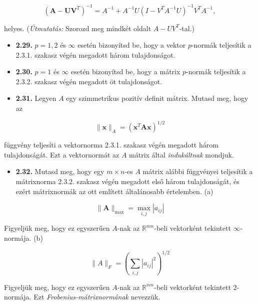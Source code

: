 \documentclass[
  magyar,
  11pt]{article}
\providecommand{\tightlist}{%
  \setlength{\itemsep}{0pt}\setlength{\parskip}{0pt}}
\providecommand{\boldsymbol}[1]{\mathbf{#1}}
\begin{document}
\[(\boldsymbol{A} - \boldsymbol{U}\boldsymbol{V}^T)^{-1} = A^{-1} + A^{-1}U(I - V^T A^{-1}U)^{-1}V^T A^{-1},\]

helyes. (\emph{Útmutatás:} Szorozd meg mindkét oldalt \(A - UV^T\)-tal.)

\begin{itemize}
\tightlist
\item
  \textbf{2.29.} \(p = 1, 2\) és \(\infty\) esetén bizonyítsd be, hogy a
  vektor \(p\)-normák teljesítik a 2.3.1. szakasz végén megadott három
  tulajdonságot.
\item
  \textbf{2.30.} \(p = 1\) és \(\infty\) esetén bizonyítsd be, hogy a
  mátrix \(p\)-normák teljesítik a 2.3.2. szakasz végén megadott öt
  tulajdonságot.
\item
  \textbf{2.31.} Legyen \(A\) egy szimmetrikus pozitív definit mátrix.
  Mutasd meg, hogy az
\end{itemize}

\[\|\boldsymbol{x}\|_A = (\boldsymbol{x}^T \boldsymbol{A} \boldsymbol{x})^{1/2}\]

függvény teljesíti a vektornorma 2.3.1. szakasz végén megadott három
tulajdonságát. Ezt a vektornormát az \(A\) mátrix által
\emph{indukáltnak} mondjuk.

\begin{itemize}
\tightlist
\item
  \textbf{2.32.} Mutasd meg, hogy egy \(m \times n\)-es \(A\) mátrix
  alábbi függvényei teljesítik a mátrixnorma 2.3.2. szakasz végén
  megadott első három tulajdonságát, és ezért mátrixnormák az ott
  említett általánosabb értelemben. (a)
\end{itemize}

\[\|\boldsymbol{A}\|_{\max} = \max_{i,j} |a_{ij}|\]

Figyeljük meg, hogy ez egyszerűen \(A\)-nak az \(\mathbb{R}^{mn}\)-beli
vektorként tekintett \(\infty\)-normája. (b)

\[\|A\|_F = \left(\sum_{i,j} |a_{ij}|^2\right)^{1/2}\]

Figyeljük meg, hogy ez egyszerűen \(A\)-nak az \(\mathbb{R}^{mn}\)-beli
vektorként tekintett \(2\)-normája. Ezt \emph{Frobenius-mátrixnormának}
nevezzük.
\end{document}

